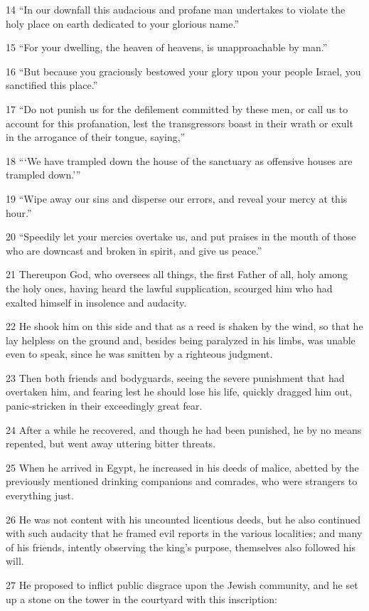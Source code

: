 \par 14 “In our downfall this audacious and profane man undertakes to violate the holy place on earth dedicated to your glorious name.”
\par 15 “For your dwelling, the heaven of heavens, is unapproachable by man.”
\par 16 “But because you graciously bestowed your glory upon your people Israel, you sanctified this place.”
\par 17 “Do not punish us for the defilement committed by these men, or call us to account for this profanation, lest the transgressors boast in their wrath or exult in the arrogance of their tongue, saying,”
\par 18 “‘We have trampled down the house of the sanctuary as offensive houses are trampled down.’”
\par 19 “Wipe away our sins and disperse our errors, and reveal your mercy at this hour.”
\par 20 “Speedily let your mercies overtake us, and put praises in the mouth of those who are downcast and broken in spirit, and give us peace.”
\par 21 Thereupon God, who oversees all things, the first Father of all, holy among the holy ones, having heard the lawful supplication, scourged him who had exalted himself in insolence and audacity.
\par 22 He shook him on this side and that as a reed is shaken by the wind, so that he lay helpless on the ground and, besides being paralyzed in his limbs, was unable even to speak, since he was smitten by a righteous judgment.
\par 23 Then both friends and bodyguards, seeing the severe punishment that had overtaken him, and fearing lest he should lose his life, quickly dragged him out, panic-stricken in their exceedingly great fear.
\par 24 After a while he recovered, and though he had been punished, he by no means repented, but went away uttering bitter threats.
\par 25 When he arrived in Egypt, he increased in his deeds of malice, abetted by the previously mentioned drinking companions and comrades, who were strangers to everything just.
\par 26 He was not content with his uncounted licentious deeds, but he also continued with such audacity that he framed evil reports in the various localities; and many of his friends, intently observing the king's purpose, themselves also followed his will.
\par 27 He proposed to inflict public disgrace upon the Jewish community, and he set up a stone on the tower in the courtyard with this inscription:
